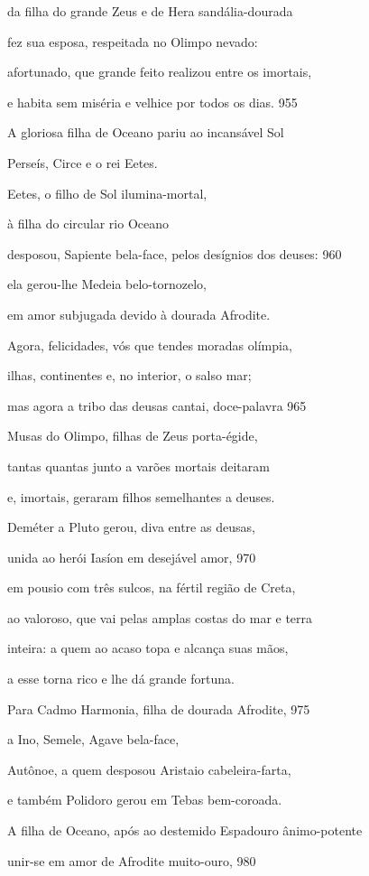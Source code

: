 da filha do grande Zeus e de Hera sandália-dourada

fez sua esposa, respeitada no Olimpo nevado:

afortunado, que grande feito realizou entre os imortais,

e habita sem miséria e velhice por todos os dias. \num{955}

\quad{}A gloriosa filha de Oceano pariu ao incansável Sol

Perseís, Circe e o rei Eetes.

Eetes, o filho de Sol ilumina-mortal,

à filha do circular rio Oceano

desposou, Sapiente bela-face, pelos desígnios dos deuses: \num{960}

ela gerou-lhe Medeia belo-tornozelo,

em amor subjugada devido à dourada Afrodite.

\medskip

Agora, felicidades, vós que tendes moradas olímpia,

ilhas, continentes e, no interior, o salso mar;

mas agora a tribo das deusas cantai, doce-palavra \num{965}

Musas do Olimpo, filhas de Zeus porta-égide,

tantas quantas junto a varões mortais deitaram

e, imortais, geraram filhos semelhantes a deuses.

\quad{}Deméter a Pluto gerou, diva entre as deusas,

unida ao herói Iasíon em desejável amor, \num{970}

em pousio com três sulcos, na fértil região de Creta,

ao valoroso, que vai pelas amplas costas do mar e terra

inteira: a quem ao acaso topa e alcança suas mãos,

a esse torna rico e lhe dá grande fortuna.

\quad{}Para Cadmo Harmonia, filha de dourada Afrodite, \num{975}

a Ino, Semele, Agave bela-face,

Autônoe, a quem desposou Aristaio cabeleira-farta,

e também Polidoro gerou em Tebas bem-coroada.

\quad{}A filha de Oceano, após ao destemido Espadouro ânimo-potente

unir-se em amor de Afrodite muito-ouro, \num{980}

